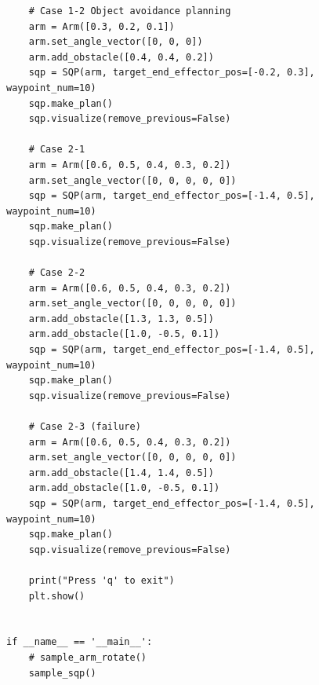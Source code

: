 \begin{verbatim}
    # Case 1-2 Object avoidance planning
    arm = Arm([0.3, 0.2, 0.1])
    arm.set_angle_vector([0, 0, 0])
    arm.add_obstacle([0.4, 0.4, 0.2])
    sqp = SQP(arm, target_end_effector_pos=[-0.2, 0.3], waypoint_num=10)
    sqp.make_plan()
    sqp.visualize(remove_previous=False)

    # Case 2-1
    arm = Arm([0.6, 0.5, 0.4, 0.3, 0.2])
    arm.set_angle_vector([0, 0, 0, 0, 0])
    sqp = SQP(arm, target_end_effector_pos=[-1.4, 0.5], waypoint_num=10)
    sqp.make_plan()
    sqp.visualize(remove_previous=False)

    # Case 2-2
    arm = Arm([0.6, 0.5, 0.4, 0.3, 0.2])
    arm.set_angle_vector([0, 0, 0, 0, 0])
    arm.add_obstacle([1.3, 1.3, 0.5])
    arm.add_obstacle([1.0, -0.5, 0.1])
    sqp = SQP(arm, target_end_effector_pos=[-1.4, 0.5], waypoint_num=10)
    sqp.make_plan()
    sqp.visualize(remove_previous=False)

    # Case 2-3 (failure)
    arm = Arm([0.6, 0.5, 0.4, 0.3, 0.2])
    arm.set_angle_vector([0, 0, 0, 0, 0])
    arm.add_obstacle([1.4, 1.4, 0.5])
    arm.add_obstacle([1.0, -0.5, 0.1])
    sqp = SQP(arm, target_end_effector_pos=[-1.4, 0.5], waypoint_num=10)
    sqp.make_plan()
    sqp.visualize(remove_previous=False)

    print("Press 'q' to exit")
    plt.show()


if __name__ == '__main__':
    # sample_arm_rotate()
    sample_sqp()
\end{verbatim}
